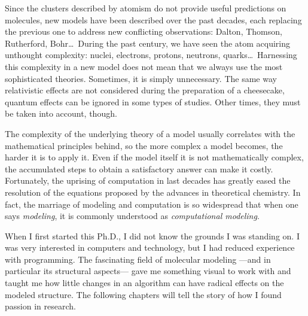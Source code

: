 Since the clusters described by atomism do not provide useful predictions on molecules, new models have been described over the past decades, each replacing the previous one to address new conflicting observations: Dalton, Thomson, Rutherford, Bohr\ldots\ During the past century, we have seen the atom acquiring unthought complexity: nuclei, electrons, protons, neutrons, quarks\ldots\  Harnessing this complexity in a new model does not mean that we always use the most sophisticated theories. Sometimes, it is simply unnecessary. The same way relativistic effects are not considered during the preparation of a cheesecake, quantum effects can be ignored in some types of studies. Other times, they must be taken into account, though.

The complexity of the underlying theory of a model usually correlates with the mathematical principles behind, so the more complex a model becomes, the harder it is to apply it. Even if the model itself it is not mathematically complex, the accumulated steps to obtain a satisfactory answer can make it costly. Fortunately, the uprising of computation in last decades has greatly eased the resolution of the equations proposed by the advances in theoretical chemistry. In fact, the marriage of modeling and computation is so widespread that when one says \textit{modeling}, it is commonly understood as \textit{computational modeling}.


When I first started this Ph.D., I did not know the grounds I was standing on. I was very interested in computers and technology, but I had reduced experience with programming. The fascinating field of molecular modeling ---and in particular its structural aspects--- gave me something visual to work with and taught me how little changes in an algorithm can have radical effects on the modeled structure. The following chapters will tell the story of how I found passion in research.